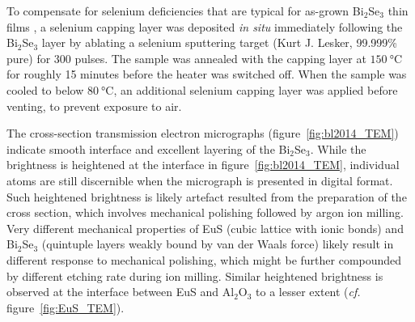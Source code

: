 To compensate for selenium deficiencies that are typical for as-grown Bi$_2$Se$_3$ thin films \cite{Zhanybek3, zhangli2012, zhangli2013, TI_ARPES1, ARPES_thickness}, a selenium capping layer was deposited \textit{in situ} immediately following the Bi$_2$Se$_3$ layer by ablating a selenium sputtering target (Kurt J. Lesker, 99.999\% pure) for 300 pulses. The sample was annealed with the capping layer at $\SI{150}{\degreeCelsius}$ for roughly 15 minutes before the heater was switched off. When the sample was cooled to below $\SI{80}{\degreeCelsius}$, an additional selenium capping layer was applied before venting, to prevent exposure to air.

The cross-section transmission electron micrographs (figure~\ref{fig:bl2014_TEM}) indicate smooth interface and excellent layering of the Bi$_2$Se$_3$. While the brightness is heightened at the interface in figure~\ref{fig:bl2014_TEM}, individual atoms are still discernible when the micrograph is presented in digital format. Such heightened brightness is likely artefact resulted from the preparation of the cross section, which involves mechanical polishing followed by argon ion milling. Very different mechanical properties of EuS (cubic lattice with ionic bonds) and Bi$_2$Se$_3$ (quintuple layers weakly bound by van der Waals force) likely result in different response to mechanical polishing, which might be further compounded by different etching rate during ion milling. Similar heightened brightness is observed at the interface between EuS and Al$_2$O$_3$ to a lesser extent (\textit{cf.} figure~\ref{fig:EuS_TEM}).


